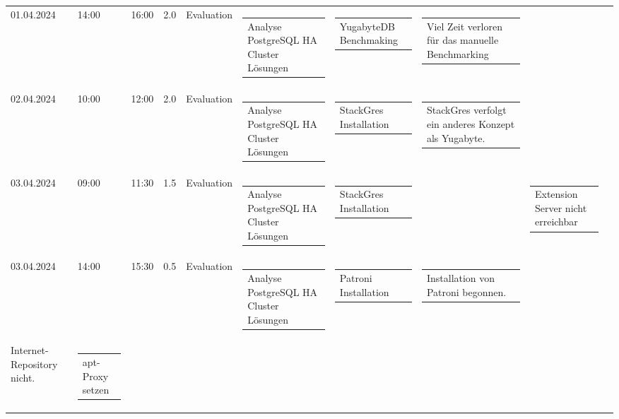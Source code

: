 {\begin{longtable}[H]{lllrllllll}
01.04.2024 & 14:00 & 16:00 & 2.0 & Evaluation & \begin{tabular}[c]{@{}l@{}}Analyse PostgreSQL HA Cluster Lösungen\end{tabular} & \begin{tabular}[c]{@{}l@{}}YugabyteDB Benchmaking\end{tabular} & \begin{tabular}[c]{@{}l@{}}Viel Zeit verloren für das manuelle Benchmarking\end{tabular} & \begin{tabular}[c]{@{}l@{}}\end{tabular} & \begin{tabular}[c]{@{}l@{}}\end{tabular} \\
02.04.2024 & 10:00 & 12:00 & 2.0 & Evaluation & \begin{tabular}[c]{@{}l@{}}Analyse PostgreSQL HA Cluster Lösungen\end{tabular} & \begin{tabular}[c]{@{}l@{}}StackGres Installation\end{tabular} & \begin{tabular}[c]{@{}l@{}}StackGres verfolgt ein anderes Konzept als Yugabyte.\end{tabular} & \begin{tabular}[c]{@{}l@{}}\end{tabular} & \begin{tabular}[c]{@{}l@{}}\end{tabular} \\
03.04.2024 & 09:00 & 11:30 & 1.5 & Evaluation & \begin{tabular}[c]{@{}l@{}}Analyse PostgreSQL HA Cluster Lösungen\end{tabular} & \begin{tabular}[c]{@{}l@{}}StackGres Installation\end{tabular} & \begin{tabular}[c]{@{}l@{}}\end{tabular} & \begin{tabular}[c]{@{}l@{}}Extension Server nicht erreichbar\end{tabular} & \begin{tabular}[c]{@{}l@{}}\end{tabular} \\
03.04.2024 & 14:00 & 15:30 & 0.5 & Evaluation & \begin{tabular}[c]{@{}l@{}}Analyse PostgreSQL HA Cluster Lösungen\end{tabular} & \begin{tabular}[c]{@{}l@{}}Patroni Installation\end{tabular} & \begin{tabular}[c]{@{}l@{}}Installation von Patroni begonnen.\end{tabular} & \begin{tabular}[c]{@{}l@{}}Foreman Repositories waren erreichbar,\\Internet-Repository nicht.\end{tabular} & \begin{tabular}[c]{@{}l@{}}apt-Proxy setzen\end{tabular} \\

\end{longtable}}
